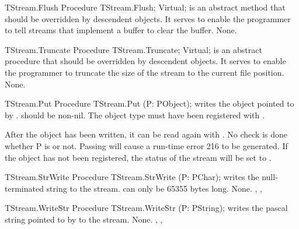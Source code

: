 \begin{procedure}{TStream.Flush}
\Declaration 
Procedure TStream.Flush; Virtual;
\Description
{} is an abstract method that should be overridden by descendent
objects. It serves to enable the programmer to tell streams that implement 
a buffer to clear the buffer.
\Errors
None.
\SeeAlso
{}
\end{procedure}

\begin{procedure}{TStream.Truncate}
\Declaration
Procedure TStream.Truncate; Virtual;
\Description
{} is an abstract procedure that should be overridden by
descendent objects. It serves to enable the programmer to truncate the
size of the stream to the current file position.
\Errors
None.
\SeeAlso
{}
\end{procedure}

\begin{procedure}{TStream.Put}
\Declaration
Procedure TStream.Put (P: PObject);
\Description
{} writes the object pointed to by .  should be
non-nil. The object type must have been registered with .

After the object has been written, it can be read again with .
\Errors
No check is done whether P is  or not. Passing  will cause
a run-time error 216 to be generated. If the object has not been registered,
the status of the stream will be set to .
\SeeAlso
{}
\end{procedure}

\begin{procedure}{TStream.StrWrite}
\Declaration
Procedure TStream.StrWrite (P: PChar);
\Description
{} writes the null-terminated string  to the stream.
 can only be 65355 bytes long.
\Errors
None.
\SeeAlso
{}, ,
\end{procedure}

\begin{procedure}{TStream.WriteStr}
\Declaration
Procedure TStream.WriteStr (P: PString);
\Description
{} writes the pascal string pointed to by  to the stream.
\Errors
None.
\SeeAlso
{}, ,
\end{procedure}

